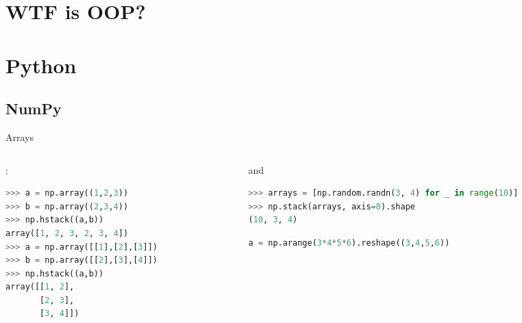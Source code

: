 \documentclass[main.tex]{subfiles}
\begin{document}
\section{WTF is OOP?}

\section{Python}

\subsection{NumPy}

\begin{frame}[fragile]{Arrays}
\begin{columns}[T]
\begin{column}{0.5\textwidth}
:
\begin{lstlisting}[language=Python,basicstyle=\Tiny]
>>> a = np.array((1,2,3))
>>> b = np.array((2,3,4))
>>> np.hstack((a,b))
array([1, 2, 3, 2, 3, 4])
>>> a = np.array([[1],[2],[3]])
>>> b = np.array([[2],[3],[4]])
>>> np.hstack((a,b))
array([[1, 2],
       [2, 3],
       [3, 4]])
\end{lstlisting}
\end{column}
\begin{column}{0.5\textwidth}
 and 
\begin{lstlisting}[language=Python,basicstyle=\Tiny]
>>> arrays = [np.random.randn(3, 4) for _ in range(10)]
>>> np.stack(arrays, axis=0).shape
(10, 3, 4)
\end{lstlisting}
\begin{lstlisting}[language=Python,basicstyle=\Tiny]
a = np.arange(3*4*5*6).reshape((3,4,5,6))
\end{lstlisting}
\end{column}
\end{columns}
\end{frame}
\end{document}
